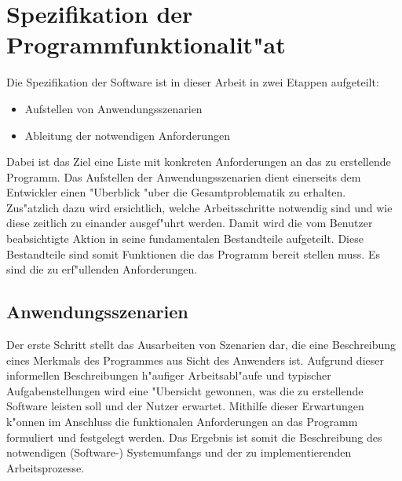 \chapter{Spezifikation der Programmfunktionalit"at}
\label{chap:spezifikation}

Die Spezifikation der Software ist in dieser Arbeit in zwei Etappen aufgeteilt:
\begin{itemize}
	\item Aufstellen von Anwendungsszenarien
	\item Ableitung der notwendigen Anforderungen
\end{itemize}
Dabei ist das Ziel eine Liste mit konkreten Anforderungen an das zu erstellende Programm.
Das Aufstellen der Anwendungsszenarien dient einerseits dem Entwickler einen "Uberblick "uber die Gesamtproblematik zu erhalten.
Zus"atzlich dazu wird ersichtlich, welche Arbeitsschritte notwendig sind und wie diese zeitlich zu einander ausgef"uhrt werden.
Damit wird die vom Benutzer beabsichtigte Aktion in seine fundamentalen Bestandteile aufgeteilt.
Diese Bestandteile sind somit Funktionen die das Programm bereit stellen muss.
Es sind die zu erf"ullenden Anforderungen.

\section{Anwendungsszenarien}
\label{chap:anwendungsszenarien}


Der erste Schritt stellt das Ausarbeiten von Szenarien dar, die eine Beschreibung eines Merkmals des Programmes aus Sicht des Anwenders ist.
Aufgrund dieser informellen Beschreibungen h"aufiger Arbeitsabl"aufe und typischer Aufgabenstellungen wird eine "Ubersicht gewonnen, was die zu erstellende Software leisten soll und der Nutzer erwartet.
Mithilfe dieser Erwartungen k"onnen im Anschluss die funktionalen Anforderungen an das Programm formuliert und festgelegt werden.
Das Ergebnis ist somit die Beschreibung des notwendigen (Software-) Systemumfangs und der zu implementierenden Arbeitsprozesse.

